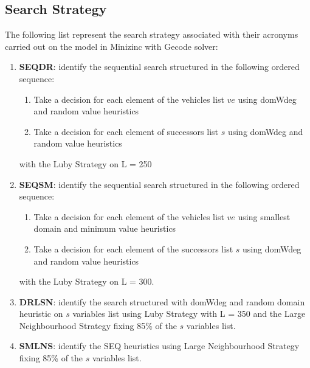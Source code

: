 \subsection{Search Strategy}
The following list represent the search strategy associated with their acronyms carried out on the model in Minizinc with Gecode solver:
\begin{enumerate}
    \item \textbf{SEQDR}: identify the sequential search structured in the following ordered sequence:
    \begin{enumerate}
        \item Take a decision for each element of the vehicles list \begin{math} ve \end{math} using domWdeg and random value heuristics
        \item Take a decision for each element of successors list \begin{math} s \end{math} using domWdeg and random value heuristics
    \end{enumerate} with the Luby Strategy on L = 250
    \item \textbf{SEQSM}: identify the sequential search structured in the following ordered sequence:
    \begin{enumerate}
        \item Take a decision for each element of the vehicles list \begin{math} ve \end{math} using smallest domain and minimum value heuristics
        \item Take a decision for each element of the successors list \begin{math} s \end{math} using domWdeg and random value heuristics
        \end{enumerate} with the Luby Strategy on L = 300.
    \item \textbf{DRLSN}: identify the search structured with domWdeg and random domain heuristic on \begin{math} s \end{math} variables list using Luby Strategy with L = 350 and the Large Neighbourhood Strategy fixing 85\% of the \begin{math}s\end{math} variables list.
    \item \textbf{SMLNS}: identify the SEQ heuristics using Large Neighbourhood Strategy fixing 85\% of the \begin{math} s \end{math} variables list.
    
    
\end{enumerate}
\newpage

